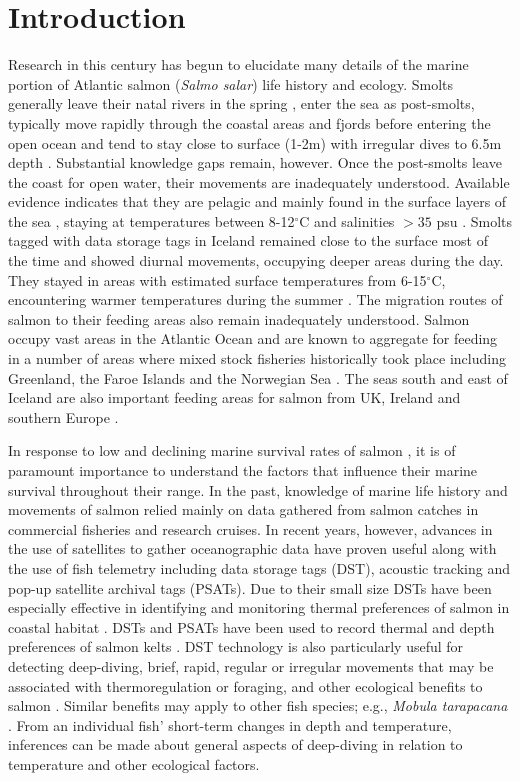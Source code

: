 \section{Introduction}
\label{intro}
Research in this century has begun to elucidate many details of the marine portion of Atlantic salmon (\textit{Salmo salar}) life history and ecology. 
Smolts generally leave their natal rivers in the spring \citep{Otero2014}, enter the sea as post-smolts, typically move rapidly through the coastal areas and fjords before entering the open ocean \citep{Thorstad2011,Lacroix2004,Gudjonsson2005} and tend to stay close to surface (1-2m) with irregular dives to 6.5m depth \citep{Davidsen2008}.  
Substantial knowledge gaps remain, however. 
Once the post-smolts leave the coast for open water, their movements are inadequately understood. 
Available evidence indicates that they are pelagic and mainly found in the surface layers of the sea \citep{Holm2006}, staying at temperatures between 8-12$^\circ$C \citep{Friedland2000} and salinities $> 35$ psu \citep{Holm2003}. 
Smolts tagged with data storage tags in Iceland remained close to the surface most of the time and showed diurnal movements, occupying deeper areas during the day. They stayed in areas with estimated surface temperatures from 6-15$^\circ$C, encountering warmer temperatures during the summer \citep{Gudjonsson2015}. 
The migration routes of salmon to their feeding areas also remain inadequately understood. 
Salmon occupy vast areas in the Atlantic Ocean and are known to aggregate for feeding in a number of areas where mixed stock fisheries historically took place including Greenland, the Faroe Islands and the Norwegian Sea \citep{Chaput2012}. 
The seas south and east of Iceland are also important feeding areas for salmon from UK, Ireland and southern Europe \citep{Olafsson2015}. 

In response to low and declining marine survival rates of salmon \citep{Chaput2012}, it is of paramount importance to understand the factors that influence their marine survival throughout their range. 
In the past, knowledge of marine life history and movements of salmon relied mainly on data gathered from salmon catches in commercial fisheries and research cruises. 
In recent years, however, advances in the use of satellites to gather oceanographic data have proven useful along with the use of fish telemetry including data storage tags (DST), acoustic tracking and pop-up satellite archival tags (PSATs). 
Due to their small size DSTs have been especially effective in identifying and monitoring thermal preferences of salmon in coastal habitat \citep{Reddin2004,Reddin2006}.
DSTs and PSATs have been used to record thermal and depth preferences of salmon kelts \citep{Reddin2011,Chittenden2013,Lacroix2013,Strom2017}. 
DST technology is also particularly useful for detecting deep-diving, brief, rapid, regular or irregular movements that may be associated with thermoregulation or foraging, and other ecological benefits to salmon \citep{Reddin2006}. 
Similar benefits may apply to  other fish species; e.g., \textit{Mobula tarapacana} \citep{Thorrold2014}. 
From an  individual fish' short-term changes in depth and temperature, inferences can be made about general aspects of deep-diving in relation to temperature and other ecological factors.


